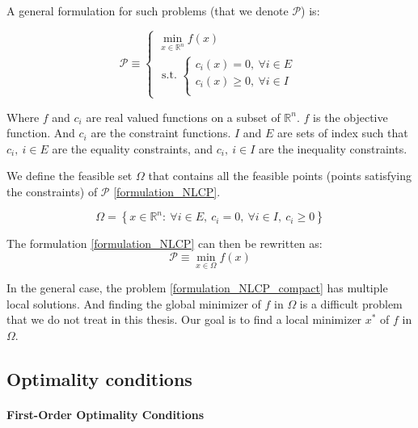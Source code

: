 A general formulation for such problems (that we denote $\mathcal{P}$) is:

\begin{equation}
  \label{formulation_NLCP}
  \mathcal{P} \equiv
  \left\{
  \begin{array}{l}
    \min\limits_{x\in\mathbb{R}^n}{f(x)}\\
    \text{ s.t. }
    \left\{
    \begin{array}{l}
      c_i(x) = 0,\ \forall i\in{E}\\
      c_i(x) \geq 0,\ \forall i\in{I}\\
    \end{array}
    \right.
  \end{array}
  \right.
\end{equation}

Where $f$ and $c_i$ are real valued functions on a subset of $\mathbb{R}^n$.
$f$ is the objective function. And $c_i$ are the constraint functions.
${I}$ and ${E}$ are sets of index such that $c_i,\ i\in{E}$ are the equality constraints, and $c_i,\ i\in{I}$ are the inequality constraints.

We define the feasible set $\Omega$ that contains all the feasible points (points satisfying the constraints) of $\mathcal{P}$ \ref{formulation_NLCP}.

\begin{equation}
  \Omega = \left\{ x\in \mathbb{R}^n:\ \forall i\in {E},\ c_i=0,\ \forall i\in{I},\ c_i \geq0\right\}
\end{equation}

The formulation \ref{formulation_NLCP} can then be rewritten as:
\begin{equation}
  \label{formulation_NLCP_compact}
  \mathcal{P} \equiv \min_{x\in\Omega}{f(x)}
\end{equation}

In the general case, the problem \ref{formulation_NLCP_compact} has multiple local solutions.
And finding the global minimizer of $f$ in $\Omega$ is a difficult problem that we do not treat in this thesis.
Our goal is to find a local minimizer $x^*$ of $f$ in $\Omega$.

\subsection{Optimality conditions}

\paragraph{First-Order Optimality Conditions}

